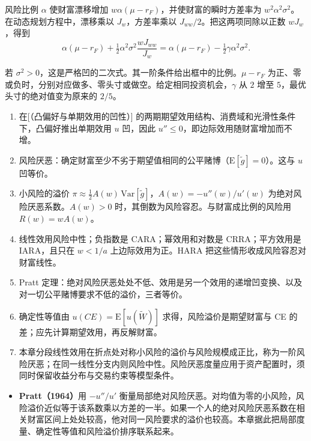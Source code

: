 风险比例 $\alpha$ 使财富漂移增加 $w\alpha(\mu-r_F)$，并使财富的瞬时方差率为 $w^2\alpha^2\sigma^2$。在动态规划方程中，漂移乘以 $J_w$，方差率乘以 $J_{ww}/2$。把这两项同除以正数 $wJ_w$，得到
\[
 \alpha(\mu-r_F)+\tfrac12\alpha^2\sigma^2\frac{wJ_{ww}}{J_w}
 =\alpha(\mu-r_F)-\tfrac12\gamma\alpha^2\sigma^2.
\]

若 $\sigma^2>0$，这是严格凹的二次式。其一阶条件给出框中的比例。$\mu-r_F$ 为正、零或负时，分别对应做多、零头寸或做空。给定相同投资机会，$\gamma$ 从 $2$ 增至 $5$，最优头寸的绝对值变为原来的 $2/5$。

\WJChapterSummary
\begin{tcolorbox}[summary]
\begin{enumerate}
    \item 在[（凸偏好与单期效用的凹性）] 的两期期望效用结构、消费域和光滑性条件下，凸偏好推出单期效用 $u$ 凹，因此 $u''\le 0$，即边际效用随财富增加而不增。
    \item 风险厌恶：确定财富至少不劣于期望值相同的公平赌博（$\mathrm{E}[\tilde{g}]=0$）。这与 $u$ 凹等价。
    \item 小风险的溢价 $\pi\approx\tfrac12 A(w)\,\mathrm{Var}[\tilde{g}]$，$A(w)=-u''(w)/u'(w)$ 为绝对风险厌恶系数。$A(w)>0$ 时，其倒数为风险容忍。与财富成比例的风险用 $R(w)=wA(w)$。
    \item 线性效用风险中性；负指数是 CARA；幂效用和对数是 CRRA；平方效用是 IARA，且只在 $w<1/a$ 上边际效用为正。HARA 把这些情形收成风险容忍对财富线性。
    \item Pratt 定理：绝对风险厌恶处处不低、效用是另一个效用的递增凹变换、以及对一切公平赌博要求不低的溢价，三者等价。
    \item 确定性等值由 $u(CE)=\mathrm E[u(\widetilde W)]$ 求得，风险溢价是期望财富与 CE 的差；应先计算期望效用，再反解财富。
    \item 本章分段线性效用在折点处对称小风险的溢价与风险规模成正比，称为一阶风险厌恶；在同一线性分支内则风险中性。风险厌恶度量应用于资产配置时，须同时保留收益分布与交易约束等模型条件。
\end{enumerate}
\end{tcolorbox}

\begin{tcolorbox}[knowledge,breakable=false,title={参考文献与本章贡献}]
\begin{itemize}
 \item \textbf{Pratt（1964）}用 $-u''/u'$ 衡量局部绝对风险厌恶。对均值为零的小风险，风险溢价近似等于该系数乘以方差的一半。如果一个人的绝对风险厌恶系数在相关财富区间上处处较高，他对同一风险要求的溢价也较高。本章据此把局部度量、确定性等值和风险溢价排序联系起来。
\end{itemize}
\end{tcolorbox}

\fi

\WJChapterExercises

\endgroup
